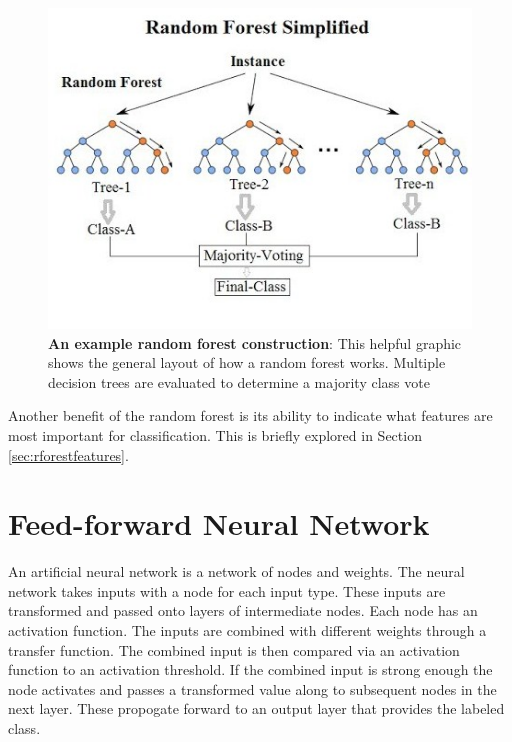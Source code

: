 \documentclass[twoside]{report}
\begin{document}
\begin{figure}[ht]
  \begin{center}
    \includegraphics[scale=0.8]{rand-forest.jpg}
    \caption{{\bf An example random forest construction}: This helpful graphic shows the general layout of how a random forest works. Multiple decision trees are evaluated to determine a majority class vote \cite{randforestgraphic}}
 \end{center}
\end{figure}

Another benefit of the random forest is its ability to indicate what features are most important for classification. This is briefly explored in Section \ref{sec:rforestfeatures}. 

\section{Feed-forward Neural Network}
An artificial neural network is a network of nodes and weights. The neural network takes inputs with a node for each input type. These inputs are transformed and passed onto layers of intermediate nodes. Each node has an activation function. The inputs are combined with different weights through a transfer function. The combined input is then compared via an activation function to an activation threshold. If the combined input is strong enough the node activates and passes a transformed value along to subsequent nodes in the next layer. These propogate forward to an output layer that provides the labeled class. 
\end{document}
